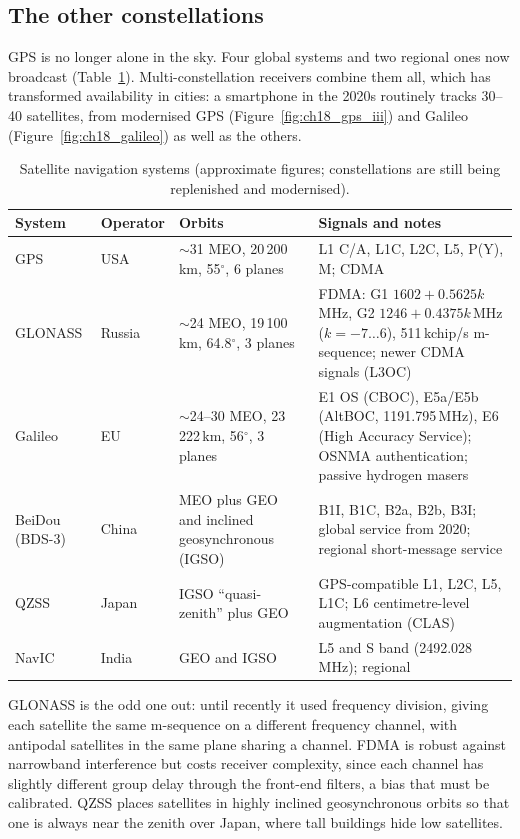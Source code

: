 \subsection{The other constellations}

GPS is no longer alone in the sky. Four global systems and two regional ones now broadcast
(Table~\ref{tab:ch18:gnss}). Multi-constellation receivers combine them all, which has transformed
availability in cities: a smartphone in the 2020s routinely tracks 30--40 satellites, from
modernised GPS (Figure~\ref{fig:ch18_gps_iii}) and Galileo (Figure~\ref{fig:ch18_galileo}) as well
as the others.

\begin{table}[htbp]\centering\small
\caption{Satellite navigation systems (approximate figures; constellations are still being
replenished and modernised).}
\label{tab:ch18:gnss}
\begin{tabularx}{\linewidth}{@{}>{\raggedright\arraybackslash}p{1.6cm} >{\raggedright\arraybackslash}p{1.1cm} >{\raggedright\arraybackslash}p{3.4cm} >{\raggedright\arraybackslash}X@{}}
\toprule
System & Operator & Orbits & Signals and notes\\
\midrule
GPS & USA & $\sim$31 MEO, 20\,200\,km, 55$^\circ$, 6 planes & L1 C/A, L1C, L2C, L5, P(Y), M; CDMA\\
GLONASS & Russia & $\sim$24 MEO, 19\,100\,km, 64.8$^\circ$, 3 planes & FDMA: G1 $1602+0.5625k$\,MHz, G2 $1246+0.4375k$\,MHz ($k=-7\ldots6$), 511\,kchip/s m-sequence; newer CDMA signals (L3OC)\\
Galileo & EU & $\sim$24--30 MEO, 23\,222\,km, 56$^\circ$, 3 planes & E1 OS (CBOC), E5a/E5b (AltBOC, 1191.795\,MHz), E6 (High Accuracy Service); OSNMA authentication; passive hydrogen masers\\
BeiDou (BDS-3) & China & MEO plus GEO and inclined geosynchronous (IGSO) & B1I, B1C, B2a, B2b, B3I; global service from 2020; regional short-message service\\
QZSS & Japan & IGSO ``quasi-zenith'' plus GEO & GPS-compatible L1, L2C, L5, L1C; L6 centimetre-level augmentation (CLAS)\\
NavIC & India & GEO and IGSO & L5 and S band (2492.028\,MHz); regional\\
\bottomrule
\end{tabularx}
\end{table}

GLONASS is the odd one out: until recently it used frequency division, giving each satellite
the same m-sequence on a different frequency channel, with antipodal satellites in the same
plane sharing a channel. FDMA is robust against narrowband interference but costs receiver
complexity, since each channel has slightly different group delay through the front-end
filters, a bias that must be calibrated. QZSS places satellites in highly inclined
geosynchronous orbits so that one is always near the zenith over Japan, where tall buildings
hide low satellites.

